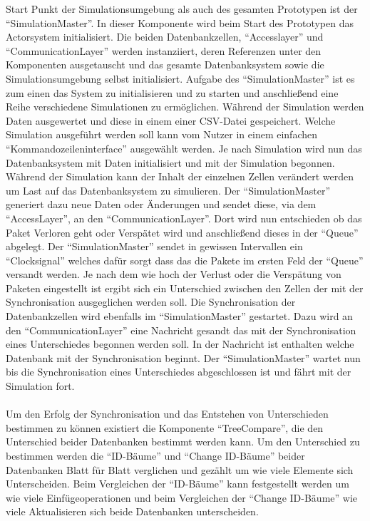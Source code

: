 \documentclass[a4paper,11pt,oneside,%
headsepline,												%
footsepline,												%
bibtotocnumbered									%
]{scrreprt}
\begin{document}
Start Punkt der Simulationsumgebung als auch des gesamten Prototypen ist der \enquote{SimulationMaster}. In dieser Komponente wird beim Start des Prototypen das Actorsystem initialisiert. Die beiden Datenbankzellen, \enquote{Accesslayer} und \enquote{CommunicationLayer} werden instanziiert, deren Referenzen unter den Komponenten ausgetauscht und das gesamte Datenbanksystem sowie die Simulationsumgebung selbst initialisiert. Aufgabe des \enquote{SimulationMaster} ist es zum einen das System zu initialisieren und zu starten und anschließend eine Reihe verschiedene Simulationen zu ermöglichen. Während der Simulation werden Daten ausgewertet und diese in einem einer CSV-Datei gespeichert. Welche Simulation ausgeführt werden soll kann vom Nutzer in einem einfachen \enquote{Kommandozeileninterface} ausgewählt werden. Je nach Simulation wird nun das Datenbanksystem mit Daten initialisiert und mit der Simulation begonnen. Während der Simulation kann der Inhalt der einzelnen Zellen verändert werden um Last auf das Datenbanksystem zu simulieren. Der \enquote{SimulationMaster} generiert dazu neue Daten oder Änderungen und sendet diese, via dem \enquote{AccessLayer}, an den \enquote{CommunicationLayer}. Dort wird nun entschieden ob das Paket Verloren geht oder Verspätet wird und anschließend dieses in der \enquote{Queue} abgelegt. Der \enquote{SimulationMaster} sendet in gewissen Intervallen ein \enquote{Clocksignal} welches dafür sorgt dass das die Pakete im ersten Feld der \enquote{Queue} versandt werden. Je nach dem wie hoch der Verlust oder die Verspätung von Paketen eingestellt ist ergibt sich ein Unterschied zwischen den Zellen der mit der Synchronisation ausgeglichen werden soll. Die Synchronisation der Datenbankzellen wird ebenfalls im \enquote{SimulationMaster} gestartet. Dazu wird an den \enquote{CommunicationLayer} eine Nachricht gesandt das mit der Synchronisation eines Unterschiedes begonnen werden soll. In der Nachricht ist enthalten welche Datenbank mit der Synchronisation beginnt. Der \enquote{SimulationMaster} wartet nun bis die Synchronisation eines Unterschiedes abgeschlossen ist und fährt mit der Simulation fort.\\\\
Um den Erfolg der Synchronisation und das Entstehen von Unterschieden bestimmen zu können existiert die Komponente \enquote{TreeCompare}, die den Unterschied beider Datenbanken bestimmt werden kann. Um den Unterschied zu bestimmen werden die \enquote{ID-Bäume} und \enquote{Change ID-Bäume} beider Datenbanken Blatt für Blatt verglichen und gezählt um wie viele Elemente sich Unterscheiden. Beim Vergleichen der \enquote{ID-Bäume} kann festgestellt werden um wie viele Einfügeoperationen und beim Vergleichen der \enquote{Change ID-Bäume} wie viele Aktualisieren sich beide Datenbanken unterscheiden.
\end{document}
